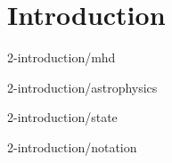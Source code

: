 \tableofcontents

\chapter{Introduction}
\setcounter{page}{1}

 {2-introduction/mhd}

 {2-introduction/astrophysics}

 {2-introduction/state}

 {2-introduction/notation}